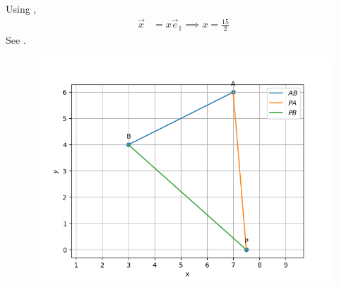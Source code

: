 	Using ,
\begin{align}
	\vec{x} &=x\vec{e}_1
	\implies x = \frac{15}{2}
\end{align}
		See .
	\begin{figure}[H]
		\centering
 \includegraphics[width=0.75\columnwidth]{chapters/11/10/1/4/figs/line.png}
		\caption{}
		\label{fig:11/10/1/4}
  	\end{figure}
